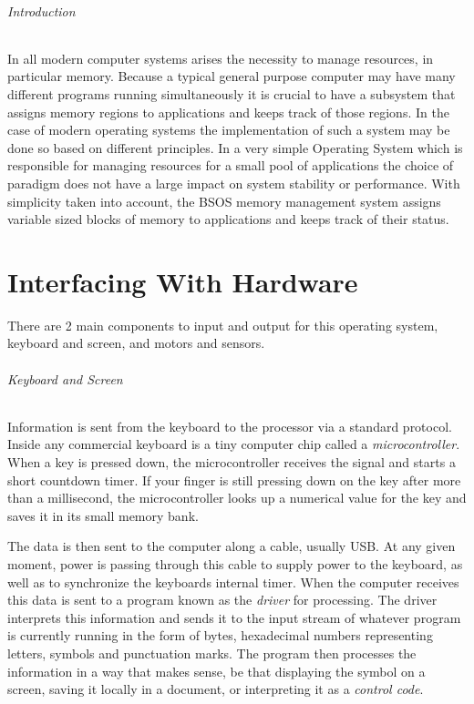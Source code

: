 \documentclass[english]{paper}
\begin{document}
\paragraph{Introduction}
In all modern computer systems arises the necessity to manage resources, in particular memory. Because a typical general purpose computer
may have many different programs running simultaneously it is crucial to have a subsystem that assigns memory regions to applications and keeps
track of those regions. In the case of modern operating systems the implementation of such a system may be done so based on different principles.
In a very simple Operating System which is responsible for managing resources for a small pool of applications the choice of paradigm does not have a large impact on system stability or performance.
With simplicity taken into account, the BSOS memory management system assigns variable sized blocks of memory to applications and keeps track of their status.


\part{Interfacing With Hardware}
There are 2 main components to input and output for this operating system, keyboard and screen, and motors and sensors.
\paragraph{Keyboard and Screen}
Information is sent from the keyboard to the processor via a standard protocol. Inside any commercial keyboard is a tiny computer chip
called a {\it microcontroller}. When a key is pressed down, the microcontroller receives the signal and starts a short countdown timer. If your finger is still pressing down on the key after more than a millisecond, the microcontroller looks up a numerical value for the key
and saves it in its small memory bank.

The data is then sent to the computer along a cable, usually USB. At any given moment, power
is passing through this cable to supply power to the keyboard, as well as to synchronize the keyboards internal timer. When the
computer receives this data is sent to a program known as the {\it driver} for processing. The driver interprets this information
and sends it to the input stream of whatever program is currently running in the form of bytes, hexadecimal numbers representing
letters, symbols and punctuation marks. The program then processes the information in a way that makes sense, be that displaying
the symbol on a screen, saving it locally in a document, or interpreting it as a {\it control code}.
\end{document}

